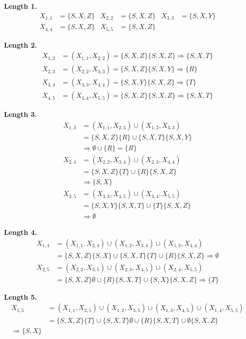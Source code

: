 \documentclass{article}
\theoremstyle{definition}
\newenvironment {solution}
{
\begin{tcolorbox}[breakable]
}
{
\end{tcolorbox}
}
\begin{document}
\begin{enumerate}
\begin{solution}
\textbf{Length 1.}
\begin{align*}
    X_{1,1} &= \{S,X,Z\} & X_{2,2} &= \{S,X,Z\} & X_{3,3} &= \{S,X,Y\}\\
    X_{4,4} &= \{S,X,Z\} & X_{5,5} &= \{S,X,Z\}
\end{align*}

\textbf{Length 2.}
\begin{align*}
    X_{1,2} &= (X_{1,1}, X_{2,2}) = \{S,X,Z\}\{S,X,Z\} \Rightarrow \{S,X,T\}\\
    X_{2,3} &= (X_{2,2}, X_{3,3}) = \{S,X,Z\}\{S,X,Y\} \Rightarrow \{R\}\\
    X_{3,4} &= (X_{3,3}, X_{4,4}) = \{S,X,Y\}\{S,X,Z\} \Rightarrow \{T\}\\
    X_{4,5} &= (X_{4,4}, X_{5,5}) = \{S,X,Z\}\{S,X,Z\} \Rightarrow \{S,X,T\}
\end{align*}

\textbf{Length 3.}
\begin{align*}
    X_{1,3} &= (X_{1,1}, X_{2,3}) \cup (X_{1,2}, X_{3,3})\\
    &= \{S,X,Z\}\{R\} \cup \{S,X,T\}\{S,X,Y\}\\
    &\Rightarrow \emptyset \cup \{R\} = \{R\}\\[4pt]
    X_{2,4} &= (X_{2,2}, X_{3,4}) \cup (X_{2,3}, X_{4,4})\\
    &= \{S,X,Z\}\{T\} \cup \{R\}\{S,X,Z\}\\
    &\Rightarrow \{S,X\}\\[4pt]
    X_{3,5} &= (X_{3,3}, X_{4,5}) \cup (X_{3,4}, X_{5,5})\\
    &= \{S,X,Y\}\{S,X,T\} \cup \{T\}\{S,X,Z\}\\
    &\Rightarrow \emptyset
\end{align*}

\textbf{Length 4.}
\begin{align*}
    X_{1,4} &= (X_{1,1}, X_{2,4}) \cup (X_{1,2}, X_{3,4}) \cup (X_{1,3}, X_{4,4})\\
    &= \{S,X,Z\}\{S,X\} \cup \{S,X,T\}\{T\} \cup \{R\}\{S,X,Z\} \Rightarrow \emptyset\\
    X_{2,5} &= (X_{2,2}, X_{3,5}) \cup (X_{2,3}, X_{4,5}) \cup (X_{2,4}, X_{5,5})\\
    &= \{S,X,Z\}\emptyset \cup \{R\}\{S,X,T\} \cup \{S,X\}\{S,X,Z\} \Rightarrow \{T\}
\end{align*}

\textbf{Length 5.}
\begin{align*}
    X_{1,5} &= (X_{1,1}, X_{2,5}) \cup (X_{1,2}, X_{3,5}) \cup (X_{1,3}, X_{4,5}) \cup (X_{1,4}, X_{5,5})\\
    &= \{S,X,Z\}\{T\} \cup \{S,X,T\}\emptyset \cup \{R\}\{S,X,T\} \cup \emptyset\{S,X,Z\} \\
    \Rightarrow \{S,X\}
\end{align*}


\end{solution}
\end{enumerate}
\end{document}
